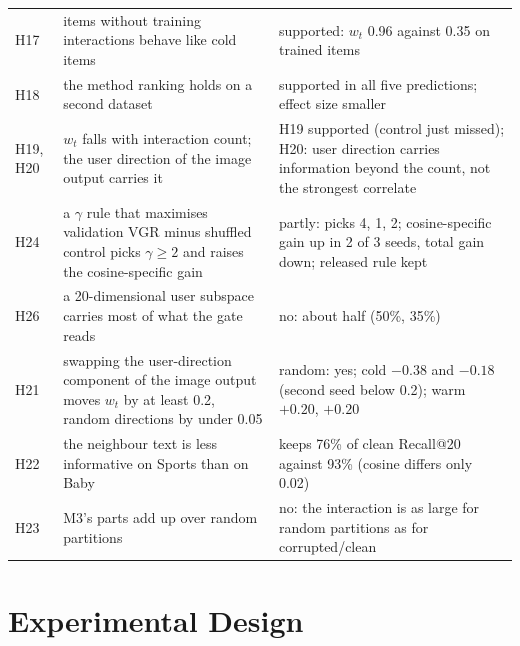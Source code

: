 \documentclass[conference]{IEEEtran}
\begin{document}
\begin{table}[!t]
\begin{tabularx}{\textwidth}{@{}l>{\raggedright\arraybackslash}p{6.7cm}>{\raggedright\arraybackslash}X@{}}
H17 & items without training interactions behave like cold items & supported: $w_t$ 0.96 against 0.35 on trained items \\
H18 & the method ranking holds on a second dataset & supported in all five predictions; effect size smaller \\
H19, H20 & $w_t$ falls with interaction count; the user direction of the image output carries it & H19 supported (control just missed); H20: user direction carries information beyond the count, not the strongest correlate \\
H24 & a $\gamma$ rule that maximises validation VGR minus shuffled control picks $\gamma\ge2$ and raises the cosine-specific gain & partly: picks 4, 1, 2; cosine-specific gain up in 2 of 3 seeds, total gain down; released rule kept \\
H26 & a 20-dimensional user subspace carries most of what the gate reads & no: about half (50\%, 35\%) \\
H21 & swapping the user-direction component of the image output moves $w_t$ by at least 0.2, random directions by under 0.05 & random: yes; cold $-0.38$ and $-0.18$ (second seed below 0.2); warm $+0.20$, $+0.20$ \\
H22 & the neighbour text is less informative on Sports than on Baby & keeps 76\% of clean Recall@20 against 93\% (cosine differs only 0.02) \\
H23 & M3's parts add up over random partitions & no: the interaction is as large for random partitions as for corrupted/clean \\
\bottomrule
\end{tabularx}
\end{table}

\section{Experimental Design}
\label{sec:design}
\end{document}
